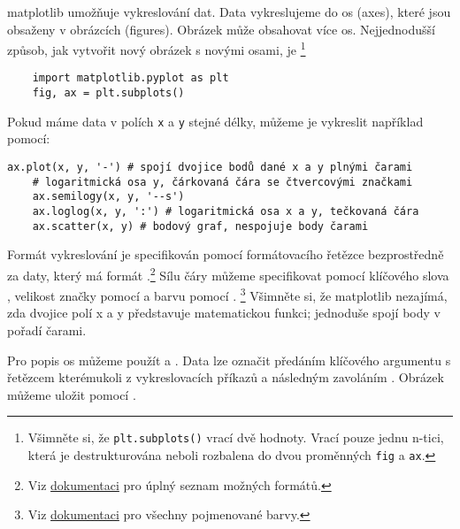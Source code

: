 matplotlib umožňuje vykreslování dat. Data vykreslujeme do os (axes), které jsou obsaženy v obrázcích (figures). Obrázek může obsahovat více os. Nejjednodušší způsob, jak vytvořit nový obrázek s novými osami, je \footnote{Všimněte si, že \lstinline{plt.subplots()} vrací dvě hodnoty. Vrací pouze jednu n-tici, která je destrukturována neboli rozbalena do dvou proměnných \lstinline{fig} a \lstinline{ax}.}
\begin{lstlisting}
    import matplotlib.pyplot as plt
    fig, ax = plt.subplots()
\end{lstlisting}
Pokud máme data v polích \lstinline{x} a \lstinline{y} stejné délky, můžeme je vykreslit například pomocí:
\begin{lstlisting}[caption=Základní vykreslování.]
    ax.plot(x, y, '-') # spojí dvojice bodů dané x a y plnými čarami
    # logaritmická osa y, čárkovaná čára se čtvercovými značkami
    ax.semilogy(x, y, '--s')
    ax.loglog(x, y, ':') # logaritmická osa x a y, tečkovaná čára
    ax.scatter(x, y) # bodový graf, nespojuje body čarami
\end{lstlisting}
Formát vykreslování je specifikován pomocí formátovacího řetězce bezprostředně za daty, který má formát .\footnote{Viz \href{https://matplotlib.org/stable/api/_as_gen/matplotlib.pyplot.plot.html}{dokumentaci} pro úplný seznam možných formátů.} Sílu čáry můžeme specifikovat pomocí klíčového slova , velikost značky pomocí  a barvu pomocí . \footnote{Viz \href{https://matplotlib.org/stable/users/explain/colors/colors.html}{dokumentaci} pro všechny pojmenované barvy.} Všimněte si, že matplotlib nezajímá, zda dvojice polí x a y představuje matematickou funkci; jednoduše spojí body v pořadí čarami.

Pro popis os můžeme použít  a . Data lze označit předáním klíčového argumentu  s řetězcem kterémukoli z vykreslovacích příkazů a následným zavoláním . Obrázek můžeme uložit pomocí .

